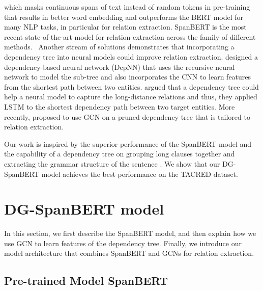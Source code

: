 \documentclass{article}
\begin{document}
which masks continuous spans of text instead of random tokens in pre-training that results in better word embedding and outperforms the BERT model for many NLP tasks, in particular for relation extraction. 
SpanBERT is the most recent state-of-the-art model for relation extraction  across the family of different methods. \
Another stream of solutions demonstrates that incorporating a dependency tree into neural models could improve relation extraction. \cite{liu2015dependency} designed a dependency-based neural network (DepNN) that uses the recursive neural network to model the sub-tree and also incorporates the CNN to learn features from the shortest path between two entities. \cite{xu2015classifying} argued that a dependency tree could help a neural model to capture the long-distance relations and thus, they applied LSTM to the shortest dependency path between two target entities. More recently, \cite{zhang2018graph} proposed to use GCN
on a pruned dependency tree that is tailored to relation extraction. 

Our work is inspired by the superior performance of the SpanBERT model \cite{joshi2019spanbert} and the capability of a dependency tree on grouping long clauses together and extracting the grammar structure of the sentence \cite{zhang2018graph}. We show that our DG-SpanBERT model achieves the best performance on the TACRED dataset.











\section{DG-SpanBERT model}
In this section, we first describe the SpanBERT model, and then explain how we use GCN to learn  features of the dependency tree. Finally, we introduce our model architecture that combines SpanBERT and GCNs for relation extraction.

\subsection{Pre-trained Model SpanBERT}
\end{document}
